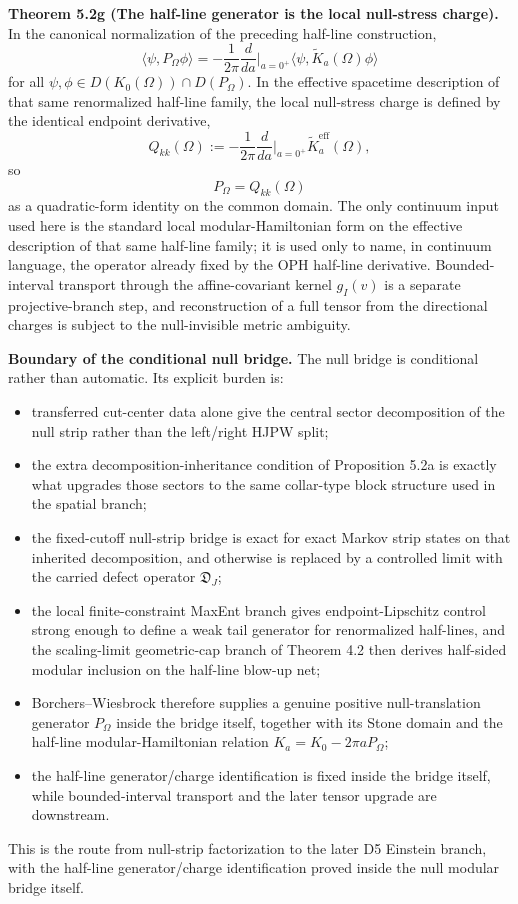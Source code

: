 \textbf{Theorem 5.2g (The half-line generator is the local null-stress charge).} In the canonical normalization of the preceding half-line construction,
\[
\langle\psi,P_\Omega\phi\rangle
=
-\frac{1}{2\pi}\frac{d}{da}\Big|_{a=0^+}
\langle\psi,\widetilde K_a(\Omega)\phi\rangle
\]
for all \(\psi,\phi\in D(K_0(\Omega))\cap D(P_\Omega)\). In the effective spacetime description of that same renormalized half-line family, the local null-stress charge is defined by the identical endpoint derivative,
\[
Q_{kk}(\Omega)
:=
-\frac{1}{2\pi}\frac{d}{da}\Big|_{a=0^+}\widetilde K^{\mathrm{eff}}_a(\Omega),
\]
so
\[
P_\Omega = Q_{kk}(\Omega)
\]
as a quadratic-form identity on the common domain. The only continuum input used here is the standard local modular-Hamiltonian form on the effective description of that same half-line family; it is used only to name, in continuum language, the operator already fixed by the OPH half-line derivative. Bounded-interval transport through the affine-covariant kernel \(g_I(v)\) is a separate projective-branch step, and reconstruction of a full tensor from the directional charges is subject to the null-invisible metric ambiguity.

\textbf{Boundary of the conditional null bridge.} The null bridge is conditional rather than automatic. Its explicit burden is:
\begin{itemize}
\tightlist
\item
  transferred cut-center data alone give the central sector decomposition of the null strip rather than the left/right HJPW split;
\item
  the extra decomposition-inheritance condition of Proposition 5.2a is exactly what upgrades those sectors to the same collar-type block structure used in the spatial branch;
\item
  the fixed-cutoff null-strip bridge is exact for exact Markov strip states on that inherited decomposition, and otherwise is replaced by a controlled limit with the carried defect operator \(\mathfrak D_J\);
\item
  the local finite-constraint MaxEnt branch gives endpoint-Lipschitz control strong enough to define a weak tail generator for renormalized half-lines, and the scaling-limit geometric-cap branch of Theorem 4.2 then derives half-sided modular inclusion on the half-line blow-up net;
\item
  Borchers--Wiesbrock therefore supplies a genuine positive null-translation generator \(P_\Omega\) inside the bridge itself, together with its Stone domain and the half-line modular-Hamiltonian relation \(K_a=K_0-2\pi aP_\Omega\);
\item
  the half-line generator/charge identification is fixed inside the bridge itself, while bounded-interval transport and the later tensor upgrade are downstream.
\end{itemize}
This is the route from null-strip factorization to the later D5 Einstein branch, with the half-line generator/charge identification proved inside the null modular bridge itself.
